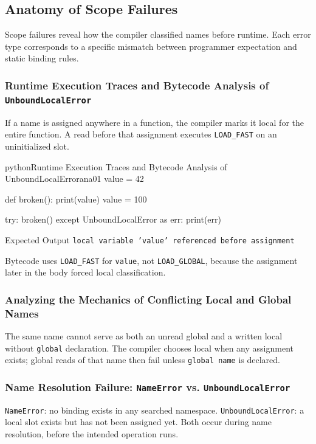 \subsection{Anatomy of Scope Failures}

Scope failures reveal how the compiler classified names before runtime. Each error type corresponds to a specific mismatch between programmer expectation and static binding rules.

\subsubsection{Runtime Execution Traces and Bytecode Analysis of \texttt{UnboundLocalError}}

If a name is assigned anywhere in a function, the compiler marks it local for the entire function. A read before that assignment executes \texttt{LOAD\_FAST} on an uninitialized slot.

\begin{codebox}[]{python}{Runtime Execution Traces and Bytecode Analysis of UnboundLocalError}{ana01}
value = 42

def broken():
    print(value)
    value = 100

try:
    broken()
except UnboundLocalError as err:
    print(err)
\end{codebox}


\begin{iobox}{Expected Output}
\texttt{local variable 'value' referenced before assignment} \\
\end{iobox}




Bytecode uses \texttt{LOAD\_FAST} for \texttt{value}, not \texttt{LOAD\_GLOBAL}, because the assignment later in the body forced local classification.

\subsubsection{Analyzing the Mechanics of Conflicting Local and Global Names}

The same name cannot serve as both an unread global and a written local without \texttt{global} declaration. The compiler chooses local when any assignment exists; global reads of that name then fail unless \texttt{global name} is declared.

\subsubsection{Name Resolution Failure: \texttt{NameError} vs. \texttt{UnboundLocalError}}

\texttt{NameError}: no binding exists in any searched namespace. \texttt{UnboundLocalError}: a local slot exists but has not been assigned yet. Both occur during name resolution, before the intended operation runs.
